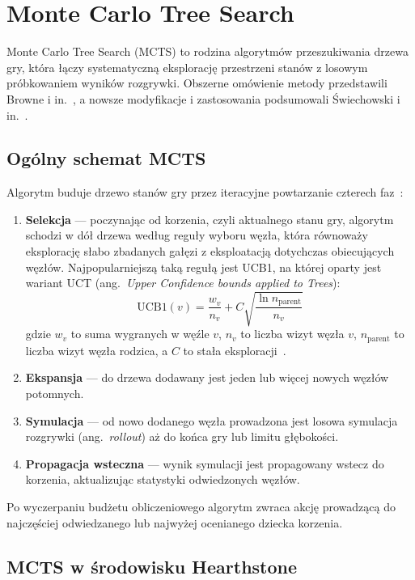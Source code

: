 \section{Monte Carlo Tree Search} \label{sec:mcts}

Monte Carlo Tree Search (MCTS) to rodzina algorytmów przeszukiwania drzewa gry, która łączy systematyczną eksplorację przestrzeni stanów z losowym próbkowaniem wyników rozgrywki. Obszerne omówienie metody przedstawili Browne i in.~\cite{Browne2012}, a nowsze modyfikacje i zastosowania podsumowali Świechowski i in.~\cite{Swiechowski2022}.

\subsection{Ogólny schemat MCTS}

Algorytm buduje drzewo stanów gry przez iteracyjne powtarzanie czterech faz~\cite{Browne2012}:

\begin{enumerate}
\item \textbf{Selekcja} --- poczynając od korzenia, czyli aktualnego stanu gry, algorytm schodzi w dół drzewa według reguły wyboru węzła, która równoważy eksplorację słabo zbadanych gałęzi z eksploatacją dotychczas obiecujących węzłów. Najpopularniejszą taką regułą jest UCB1, na której oparty jest wariant UCT (ang.~\textit{Upper Confidence bounds applied to Trees}):
\[
\mathrm{UCB1}(v) = \frac{w_v}{n_v} + C\sqrt{\frac{\ln n_{\mathrm{parent}}}{n_v}}
\]
gdzie $w_v$ to suma wygranych w węźle $v$, $n_v$ to liczba wizyt węzła $v$, $n_{\mathrm{parent}}$ to liczba wizyt węzła rodzica, a $C$ to stała eksploracji~\cite{Browne2012}.
\item \textbf{Ekspansja} --- do drzewa dodawany jest jeden lub więcej nowych węzłów potomnych.
\item \textbf{Symulacja} --- od nowo dodanego węzła prowadzona jest losowa symulacja rozgrywki (ang.~\textit{rollout}) aż do końca gry lub limitu głębokości.
\item \textbf{Propagacja wsteczna} --- wynik symulacji jest propagowany wstecz do korzenia, aktualizując statystyki odwiedzonych węzłów.
\end{enumerate}

Po wyczerpaniu budżetu obliczeniowego algorytm zwraca akcję prowadzącą do najczęściej odwiedzanego lub najwyżej ocenianego dziecka korzenia.

\subsection{MCTS w środowisku Hearthstone}

